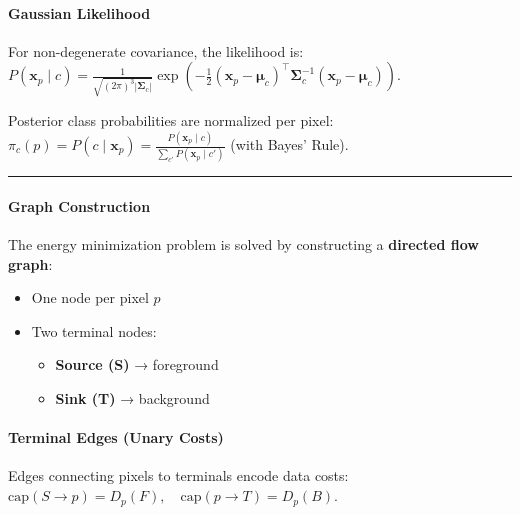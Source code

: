 \documentclass[11pt]{article}
\providecommand{\tightlist}{%
      \setlength{\itemsep}{0pt}\setlength{\parskip}{0pt}}
\begin{document}
\hypertarget{gaussian-likelihood}{%
\paragraph{\texorpdfstring{\textbf{Gaussian
Likelihood}}{Gaussian Likelihood}}\label{gaussian-likelihood}}

For non-degenerate covariance, the likelihood is:
\(P(\mathbf{x}_p \mid c) = \frac{1}{\sqrt{(2\pi)^3 |\boldsymbol{\Sigma}_c|}} \exp\left( -\frac{1}{2} (\mathbf{x}_p-\boldsymbol{\mu}_c)^\top \boldsymbol{\Sigma}_c^{-1} (\mathbf{x}_p-\boldsymbol{\mu}_c) \right)\).

Posterior class probabilities are normalized per pixel:
\(\pi_c(p) = P(c \mid \mathbf{x}_p) = \frac{P(\mathbf{x}_p \mid c)} {\sum\limits_{c'} P(\mathbf{x}_p \mid c')}\)
(with Bayes' Rule).

\begin{center}\rule{0.5\linewidth}{0.5pt}\end{center}

\hypertarget{graph-construction}{%
\paragraph{\texorpdfstring{\textbf{Graph
Construction}}{Graph Construction}}\label{graph-construction}}

The energy minimization problem is solved by constructing a
\textbf{directed flow graph}:

\begin{itemize}
\item
  One node per pixel \(p\)
\item
  Two terminal nodes:

  \begin{itemize}
  \tightlist
  \item
    \textbf{Source (S)} → foreground
  \item
    \textbf{Sink (T)} → background
  \end{itemize}
\end{itemize}

\hypertarget{terminal-edges-unary-costs}{%
\paragraph{\texorpdfstring{\textbf{Terminal Edges (Unary
Costs)}}{Terminal Edges (Unary Costs)}}\label{terminal-edges-unary-costs}}

Edges connecting pixels to terminals encode data costs:
\(\text{cap}(S \rightarrow p) = D_p(F), \quad \text{cap}(p \rightarrow T) = D_p(B)\).
\end{document}
